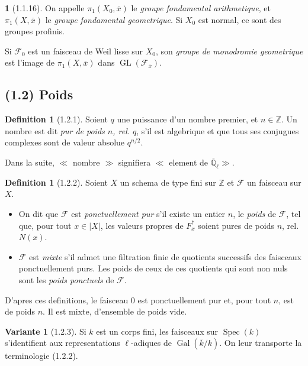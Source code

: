 \documentclass[12pt,a4paper]{article}
\theoremstyle{plain}
\theoremstyle{definition}
\newtheorem{definition}[theorem]{Definition}
\newtheorem{var}[theorem]{Variante}
\theoremstyle{definition}
\newtheorem{para}{}[section]
\theoremstyle{remark}
\DeclareMathOperator{\Gal}{Gal}
\DeclareMathOperator{\GL}{GL}
\DeclareMathOperator{\Spec}{Spec}
\begin{document}
\begin{para}[1.1.16]
On appelle $\pi_1(X_0, \overline{x})$ le \emph{groupe fondamental arithmetique}, et $\pi_1(X, \overline{x})$ le \emph{groupe fondamental geometrique}. Si $X_0$ est normal, ce sont des groupes profinis.

Si $\mathscr{F}_0$ est un faisceau de Weil lisse sur $X_0$, son \emph{groupe de monodromie geometrique} est l'image de $\pi_1(X, \overline{x})$ dans $\GL(\mathscr{F}_{\overline{x}})$.
\end{para}

\subsection*{(1.2) Poids}

\begin{definition}[1.2.1]
Soient $q$ une puissance d'un nombre premier, et $n \in \mathbb{Z}$. Un nombre est dit \emph{pur de poids $n$, rel. $q$}, s'il est algebrique et que tous ses conjugues complexes sont de valeur absolue $q^{n/2}$.

Dans la suite, $\ll$ nombre $\gg$ signifiera $\ll$ element de $\overline{\mathbb{Q}}_\ell \gg$.
\end{definition}

\begin{definition}[1.2.2]
Soient $X$ un schema de type fini sur $\mathbb{Z}$ et $\mathscr{F}$ un faisceau sur $X$.
\begin{itemize}[nosep]
\item[(i)] On dit que $\mathscr{F}$ est \emph{ponctuellement pur} s'il existe un entier $n$, le \emph{poids} de $\mathscr{F}$, tel que, pour tout $x \in |X|$, les valeurs propres de $F_x^*$ soient pures de poids $n$, rel. $N(x)$.
\item[(ii)] $\mathscr{F}$ est \emph{mixte} s'il admet une filtration finie de quotients successifs des faisceaux ponctuellement purs. Les poids de ceux de ces quotients qui sont non nuls sont les \emph{poids ponctuels} de $\mathscr{F}$.
\end{itemize}
\end{definition}

D'apres ces definitions, le faisceau $0$ est ponctuellement pur et, pour tout $n$, est de poids $n$. Il est mixte, d'ensemble de poids vide.

\begin{var}[1.2.3]
Si $k$ est un corps fini, les faisceaux sur $\Spec(k)$ s'identifient aux representations $\ell$-adiques de $\Gal(\overline{k}/k)$. On leur transporte la terminologie (1.2.2).
\end{var}
\end{document}
